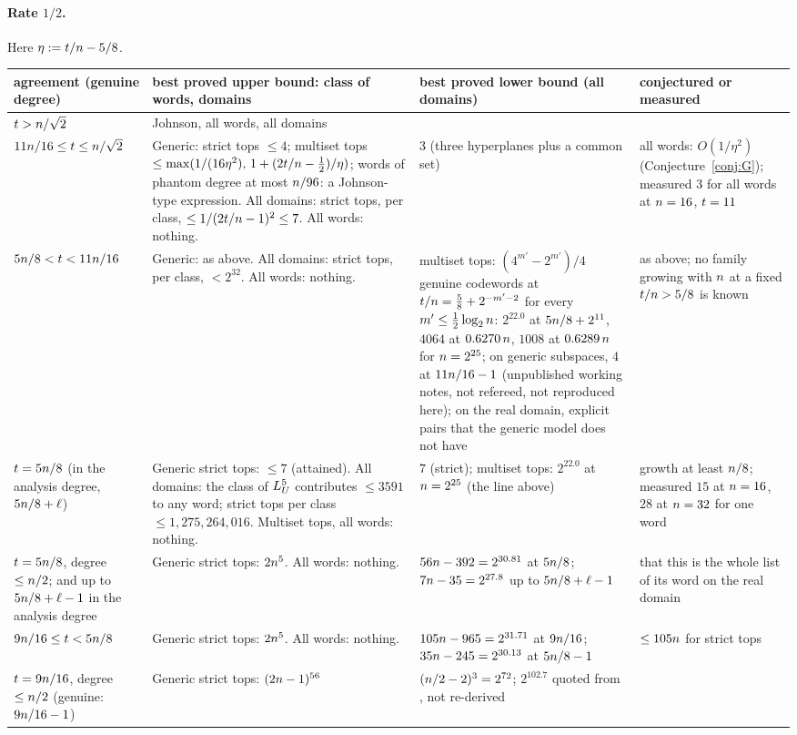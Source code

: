 \paragraph{Rate $1/2$.} Here $\eta:=t/n-5/8$.
{\small
\begin{longtable}{@{}L{0.15\textwidth}L{0.33\textwidth}L{0.27\textwidth}L{0.17\textwidth}@{}}
\toprule
agreement (genuine degree) & best proved upper bound: class of words, domains & best proved lower bound (all domains) & conjectured or measured\\
\midrule
\endhead
$t>n/\sqrt2$ & Johnson, all words, all domains & & \\
\addlinespace
$11n/16\le t\le n/\sqrt2$ & Generic: strict tops $\le4$; multiset tops $\le\max(1/(16\eta^2),\,1+(2t/n-\frac12)/\eta)$; words of phantom degree at most $n/96$: a Johnson-type expression. All domains: strict tops, per class, $\le1/(2t/n-1)^2\le7$. All words: nothing. & $3$ (three hyperplanes plus a common set) & all words: $O(1/\eta^2)$ (Conjecture~\ref{conj:G}); measured $3$ for all words at $n=16$, $t=11$\\
\addlinespace
$5n/8<t<11n/16$ & Generic: as above. All domains: strict tops, per class, $<2^{32}$. All words: nothing. & multiset tops: $(4^{m'}-2^{m'})/4$ genuine codewords at $t/n=\frac58+2^{-m'-2}$ for every $m'\le\frac12\log_2n$: $2^{22.0}$ at $5n/8+2^{11}$, $4064$ at $0.6270\,n$, $1008$ at $0.6289\,n$ for $n=2^{25}$; on generic subspaces, $4$ at $11n/16-1$ (unpublished working notes, not refereed, not reproduced here); on the real domain, explicit pairs that the generic model does not have & as above; no family growing with $n$ at a fixed $t/n>5/8$ is known\\
\addlinespace
$t=5n/8$ (in the analysis degree, $5n/8+\ell$) & Generic strict tops: $\le7$ (attained). All domains: the class of $L_U^5$ contributes $\le3591$ to any word; strict tops per class $\le1{,}275{,}264{,}016$. Multiset tops, all words: nothing. & $7$ (strict); multiset tops: $2^{22.0}$ at $n=2^{25}$ (the line above) & growth at least $n/8$; measured $15$ at $n=16$, $28$ at $n=32$ for one word\\
\addlinespace
$t=5n/8$, degree $\le n/2$; and up to $5n/8+\ell-1$ in the analysis degree & Generic strict tops: $2n^5$. All words: nothing. & $56n-392=2^{30.81}$ at $5n/8$; $7n-35=2^{27.8}$ up to $5n/8+\ell-1$ & that this is the whole list of its word on the real domain\\
\addlinespace
$9n/16\le t<5n/8$ & Generic strict tops: $2n^5$. All words: nothing. & $105n-965=2^{31.71}$ at $9n/16$; $35n-245=2^{30.13}$ at $5n/8-1$ & $\le105n$ for strict tops\\
\addlinespace
$t=9n/16$, degree $\le n/2$ (genuine: $9n/16-1$) & Generic strict tops: $(2n-1)^{56}$ & $(n/2-2)^3=2^{72}$; $2^{102.7}$ quoted from \cite{DKTZ26}, not re-derived & \\
\bottomrule
\end{longtable}}


